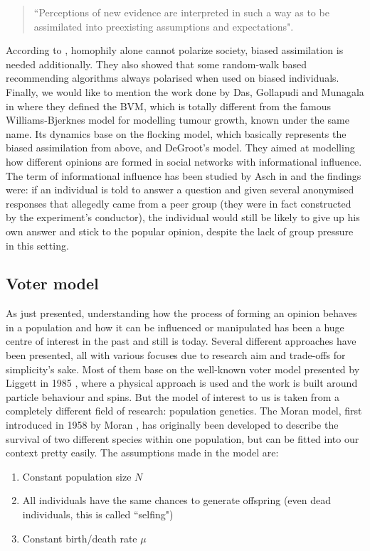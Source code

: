 \documentclass[12pt,a4paper,twoside]{article}
\begin{document}
\begin{quote}
	``Perceptions of new evidence are interpreted in such a way as to be assimilated into preexisting assumptions and expectations".
\end{quote}

According to \cite{Dandekar2013}, homophily alone cannot polarize society, biased assimilation is needed additionally. They also showed that some random-walk based recommending algorithms always polarised when used on biased individuals. Finally, we would like to mention the work done by Das, Gollapudi and Munagala in \cite{Das2014} where they defined the \ac{BVM}, which is totally different from the famous Williams-Bjerknes model \cite{Williams1972} for modelling tumour growth, known under the same name. Its dynamics base on the flocking model, which basically represents the biased assimilation from above, and DeGroot's model. They aimed at modelling how different opinions are formed in social networks with informational influence. The term of informational influence has been studied by Asch in \cite{Asch1955} and the findings were: if an individual is told to answer a question and given several anonymised responses that allegedly came from a peer group (they were in fact constructed by the experiment's conductor), the individual would still be likely to give up his own answer and stick to the popular opinion, despite the lack of group pressure in this setting.

\subsection{Voter model}\label{subsec:voter_model}
As just presented, understanding how the process of forming an opinion behaves in a population and how it can be influenced or manipulated has been a huge centre of interest in the past and still is today. Several different approaches have been presented, all with various focuses due to research aim and trade-offs for simplicity's sake. Most of them base on the well-known voter model presented by Liggett in 1985 \cite{Liggett1985}, where a physical approach is used and the work is built around particle behaviour and spins. But the model of interest to us is taken from a completely different field of research: population genetics. The Moran model, first introduced in 1958 by Moran \cite{Moran1958}, has originally been developed to describe the survival of two different species within one population, but can be fitted into our context pretty easily. The assumptions made in the model are:
\begin{enumerate}
	\item Constant population size $N$
	\item All individuals have the same chances to generate offspring (even dead individuals, this is called ``selfing")
	\item Constant birth/death rate $\mu$
\end{enumerate}
\end{document}
